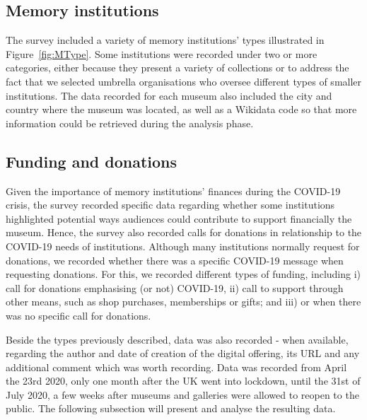 \documentclass{egpubl}
\begin{document}
\subsection{Memory institutions}
The survey included a variety of memory institutions’ types illustrated in Figure~\ref{fig:MType}. Some institutions were recorded under two or more categories, either because they present a variety of collections or to address the fact that we selected umbrella organisations who oversee different types of smaller institutions. The data recorded for each museum also included the city and country where the museum was located, as well as a Wikidata code so that more information could be retrieved during the analysis phase.

\subsection{Funding and donations}
Given the importance of memory institutions’ finances during the COVID-19 crisis, the survey recorded specific data regarding whether some institutions highlighted potential ways audiences could contribute to support financially the museum. Hence, the survey also recorded calls for donations in relationship to the COVID-19 needs of institutions. Although many institutions normally request for donations, we recorded whether there was a specific COVID-19 message when requesting donations. For this, we recorded different types of funding, including i) call for donations emphasising (or not)  COVID-19, ii) call to support through other means, such as shop purchases, memberships or gifts; and iii) or when there was no specific call for donations.

Beside the types previously described, data was also recorded - when available, regarding the author and date of creation of the digital offering, its URL and any additional comment which was worth recording. Data was recorded from April the 23rd 2020, only one month after the UK went into lockdown, until the 31st of July 2020, a few weeks after museums and galleries were allowed to reopen to the public. The following subsection will present and analyse the resulting data. 

\end{document}
